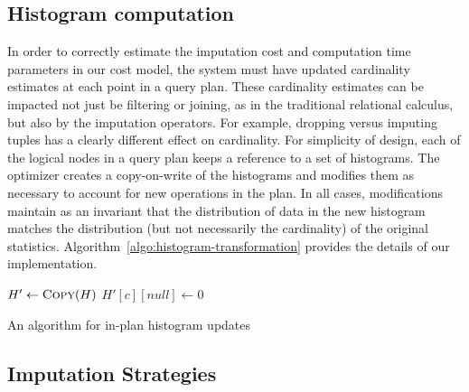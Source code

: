 \subsection{Histogram computation}
In order to correctly estimate the imputation cost and computation time parameters in our cost model,  the system must have updated cardinality estimates
at each point in a query plan. These cardinality estimates can be impacted not just be filtering or joining, as in the traditional relational calculus, but also by
the imputation operators. For example,  dropping versus imputing tuples has a clearly different effect on cardinality. For simplicity of design,
each of the logical nodes in a query plan keeps a reference to a set of histograms. The optimizer creates a copy-on-write of the histograms and modifies them
as necessary to account for new operations in the plan. In all cases, modifications maintain as an invariant that the distribution of data in the new histogram
matches the distribution (but not necessarily the cardinality) of the original statistics. Algorithm~\ref{algo:histogram-transformation} provides the details
of our implementation.



\begin{algorithm}
  \begin{algorithmic}
    
	\EndIf
	\State $H' \gets \Call{Copy}{H}$
			\State $H'[c][null] \gets 0$
		\EndFor
			\State {}
		\EndFor
		\State {}
		\State {}
	\EndIf
    \EndFunction
  \end{algorithmic}
  \caption{An algorithm for in-plan histogram updates}
  \label{algo:histogram-transformation}
\end{algorithm}

\subsection{Imputation Strategies}


